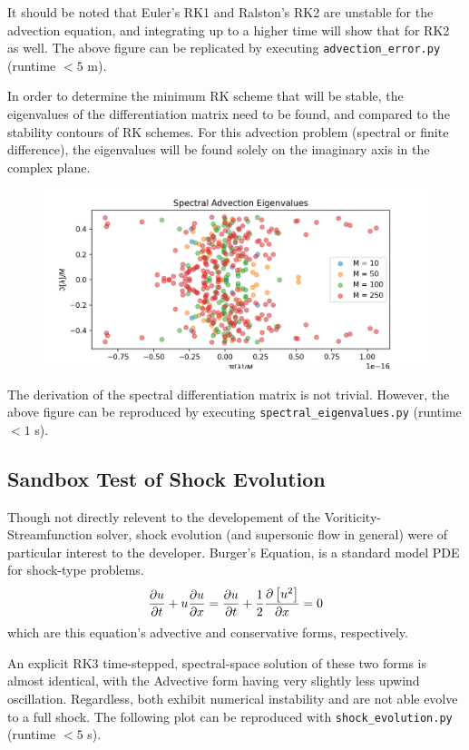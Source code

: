 \documentclass[12pt, reqno]{amsart}
\begin{document}
It should be noted that Euler's RK1 and Ralston's RK2 are unstable for the advection equation, and integrating up to a higher time will show that for RK2 as well. The above figure can be replicated by executing \texttt{advection\_error.py} (runtime $<5$ m).

In order to determine the minimum RK scheme that will be stable, the eigenvalues of the differentiation matrix need to be found, and compared to the stability contours of RK schemes. For this advection problem (spectral or finite difference), the eigenvalues will be found solely on the imaginary axis in the complex plane. 

\begin{figure}[H]
    \centering
    \includegraphics[width = 1\linewidth]{Spectral Eigenvalues.png}
\end{figure}

The derivation of the spectral differentiation matrix is not trivial. However, the above figure can be reproduced by executing \texttt{spectral\_eigenvalues.py} (runtime $<1$ s).

\subsection{Sandbox Test of Shock Evolution}
Though not directly relevent to the developement of the Voriticity-Streamfunction solver, shock evolution (and supersonic flow in general) were of particular interest to the developer. Burger's Equation, is a standard model PDE for shock-type problems.
\begin{equation}
    \pdv{u}{t} + u \pdv{u}{x} = \pdv{u}{t} + \frac{1}{2} \pdv{\left[u^2\right]}{x} = 0
\end{equation}
which are this equation's advective and conservative forms, respectively.

An explicit RK3 time-stepped, spectral-space solution of these two forms is almost identical, with the Advective form having very slightly less upwind oscillation. Regardless, both exhibit numerical instability and are not able evolve to a full shock. The following plot can be reproduced with \texttt{shock\_evolution.py} (runtime $< 5$ s).
\end{document}
